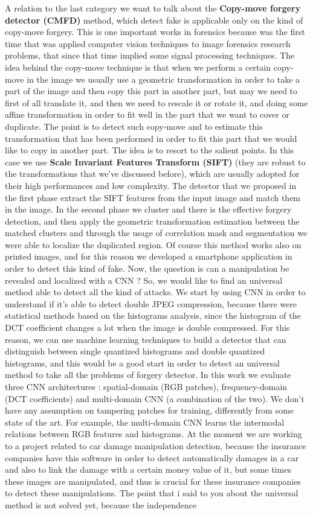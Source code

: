 \documentclass[11pt]{article}
\begin{document}
A relation to the last category we want to talk about the \textbf{Copy-move forgery detector (CMFD)} method, which detect fake is applicable only on the kind of copy-move forgery. This is one important works in forensics because was the first time that was applied computer vision techniques to image forensics research problems, that since that time implied some signal processing techniques. The idea behind the copy-move technique is that when we perform a certain copy-move in the image we usually use a geometric transformation in order to take a part of the image and then copy this part in another part, but may we need to first of all translate it, and then we need to rescale it or rotate it, and doing some affine transformation in order to fit well in the part that we want to cover or duplicate. The point is to detect such copy-move and to estimate this transformation that has been performed in order to fit this part that we would like to copy in another part. The idea is to resort to the salient points. In this case we use \textbf{Scale Invariant Features Transform (SIFT)} (they are robust to the transformations that we've discussed before), which are usually adopted for their high performances and low complexity. The detector that we proposed in the first phase extract the SIFT features from the input image and match them in the image. In the second phase we cluster and there is the effective forgery detection, and then apply the geometric transformation estimation between the matched clusters and through the usage of correlation mask and segmentation we were able to localize the duplicated region. Of course this method works also on printed images, and for this reason we developed a smartphone application in order to detect this kind of fake. Now, the question is can a manipulation be revealed and localized with a CNN ? So, we would like to find an universal method able to detect all the kind of attacks. We start by using CNN in order to understand if it's able to detect double JPEG compression, because there were statistical methods based on the histograms analysis, since the histogram of the DCT coefficient changes a lot when the image is double compressed. For this reason, we can use machine learning techniques to build a detector that can distinguish between single quantized histograms and double quantized histograms, and this would be a good start in order to detect an universal method to take all the problems of forgery detector. In this work we evaluate three CNN architectures : spatial-domain (RGB patches), frequency-domain (DCT coefficients) and multi-domain CNN (a combination of the two). We don't have any assumption on tampering patches for training, differently from some state of the art. For example, the multi-domain CNN learns the intermodal relations between RGB features and histograms. At the moment we are working to a project related to car damage manipulation detection, because the insurance companies have this software in order to detect automatically damages in a car and also to link the damage with a certain money value of it, but some times these images are manipulated, and thus is crucial for these insurance companies to detect these manipulations. The point that i said to you about the universal method is not solved yet, because the independence 
\end{document}
